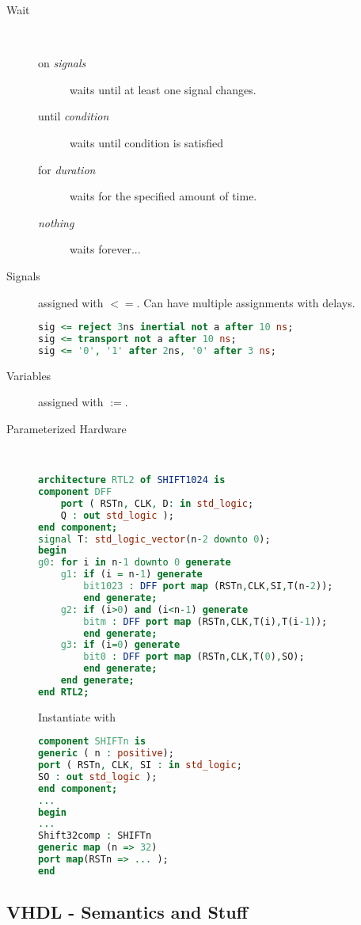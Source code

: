 \begin{description}
	\item[Wait]\ 
	\begin{description}
		\item[on \textit{signals}] waits until at least one signal changes.
		\item[until \textit{condition}] waits until condition is satisfied
		\item[for \textit{duration}] waits for the specified amount of time.
		\item[\textit{nothing}] waits forever...
	\end{description}
	\item[Signals] assigned with $<=$. Can have multiple assignments with
	delays. 
	\begin{lstlisting}[language=vhdl]
sig <= reject 3ns inertial not a after 10 ns;
sig <= transport not a after 10 ns;
sig <= '0', '1' after 2ns, '0' after 3 ns;
	\end{lstlisting}
	\item[Variables] assigned with $:=$.
	\item[Parameterized Hardware]\ 
	\begin{lstlisting}[language=vhdl]
architecture RTL2 of SHIFT1024 is
component DFF
	port ( RSTn, CLK, D: in std_logic;
	Q : out std_logic ); 
end component;
signal T: std_logic_vector(n-2 downto 0);
begin
g0: for i in n-1 downto 0 generate
	g1: if (i = n-1) generate
		bit1023 : DFF port map (RSTn,CLK,SI,T(n-2)); 
		end generate;
	g2: if (i>0) and (i<n-1) generate
		bitm : DFF port map (RSTn,CLK,T(i),T(i-1));
		end generate;
	g3: if (i=0) generate
		bit0 : DFF port map (RSTn,CLK,T(0),SO); 
		end generate;
	end generate; 
end RTL2;
	\end{lstlisting}
	Instantiate with 
	\begin{lstlisting}[language=vhdl]
component SHIFTn is
generic ( n : positive);
port ( RSTn, CLK, SI : in std_logic;
SO : out std_logic ); 
end component;
...
begin
...
Shift32comp : SHIFTn 
generic map (n => 32) 
port map(RSTn => ... );
end
	\end{lstlisting}
\end{description}

\subsection{VHDL - Semantics and Stuff}


